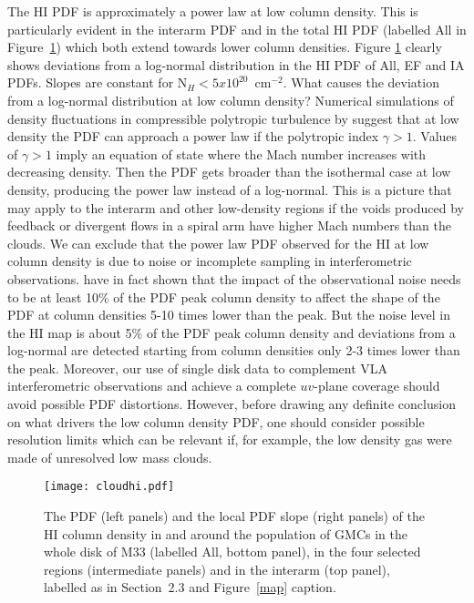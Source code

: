 \documentclass{aa}
\begin{document}
The HI PDF is approximately a power law at low column density.
This is particularly evident in the interarm PDF and  in the total  HI PDF (labelled All in Figure~\ref{HIPDF})
which both extend
towards lower column densities. Figure \ref{HIPDF} clearly shows deviations from
a log-normal distribution in the HI PDF of All, EF and IA PDFs. Slopes are constant
for N$_H < 5x10^{20}$~cm$^{-2}$. 
What causes the deviation from a log-normal distribution at low column
density? Numerical simulations of density fluctuations in compressible polytropic
turbulence by \citet{pvs98} suggest that at low density the PDF  can approach
a power law if the polytropic index $\gamma >1$. Values of $\gamma>1$ imply an
equation of state  where the Mach number increases with decreasing density.
Then the PDF gets broader than the isothermal case at low density, producing the
power law instead of a log-normal. This is a picture that may apply to the
interarm and other low-density regions if the voids produced by feedback or
divergent flows in a spiral arm have higher Mach numbers than the clouds.
We can exclude that the power law PDF observed for the HI at low column density is due to
noise or incomplete sampling in interferometric observations.
\citet{2016A&A...590A.104O} have in fact shown that the impact of the observational noise 
needs to be at least 10$\%$ of the PDF peak column density to affect the shape of the PDF
at column densities 5-10 times lower than the peak. But the noise level in the HI map is  about
5$\%$ of the PDF peak column density and deviations from a log-normal are detected starting  
from column densities only 2-3 times lower than the peak. Moreover,  our use of single disk data to
complement  VLA interferometric observations and achieve a complete  $uv$-plane  coverage
should avoid possible PDF distortions. 
However, before drawing any definite conclusion on what  drivers the low column density PDF,
one should consider possible resolution limits which can be relevant  if, for example, the low density 
gas were made of unresolved low mass clouds.  

\begin{figure}
\texttt{[image: cloudhi.pdf]}
\caption{The PDF (left panels) and the local PDF slope (right panels)
of the HI column density in and around the
population of GMCs in the whole disk of M33 (labelled All, bottom panel), in the four selected regions
(intermediate panels) and in the interarm (top panel), labelled as in Section~2.3 and Figure~\ref{map} caption.}
\label{HIPDF}
\end{figure}
\end{document}
